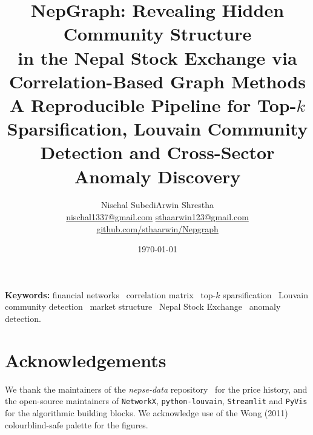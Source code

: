 \documentclass[11pt,a4paper]{article}
\title{%
  {\Large NepGraph: Revealing Hidden Community Structure\\
   in the Nepal Stock Exchange via Correlation-Based Graph Methods}\\[0.7em]
  \large A Reproducible Pipeline for Top-$k$ Sparsification,
  Louvain Community Detection and Cross-Sector Anomaly Discovery%
}
\author{%
  Nischal Subedi\;\textbar\;Arwin Shrestha\\[0.3em]
  {\small
  \href{mailto:nischal1337@gmail.com}{nischal1337@gmail.com}
  \;\textbar\;
  \href{mailto:sthaarwin123@gmail.com}{sthaarwin123@gmail.com}}\\[0.2em]
  \href{https://github.com/sthaarwin/Nepgraph}{github.com/sthaarwin/Nepgraph}%
}
\date{\today}
\theoremstyle{definition}
\begin{document}
\maketitle



\noindent\textbf{Keywords:}
financial networks \textbullet\ correlation matrix \textbullet\
top-$k$ sparsification \textbullet\ Louvain community detection \textbullet\
market structure \textbullet\ Nepal Stock Exchange \textbullet\ anomaly
detection.

\newpage







\section*{Acknowledgements}
We thank the maintainers of the \emph{nepse-data}
repository~\cite{nepse_data_repo} for the price history, and the
open-source maintainers of \texttt{NetworkX}, \texttt{python-louvain},
\texttt{Streamlit} and \texttt{PyVis} for the algorithmic building
blocks.  We acknowledge use of the Wong (2011) colourblind-safe
palette for the figures.
\end{document}
